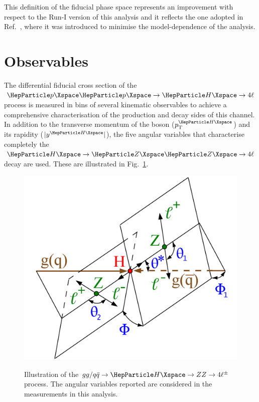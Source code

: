This definition of the fiducial phase space represents an improvement with respect to the Run-I version of this analysis and it reflects the one adopted in Ref.~\cite{CMSHIG19001}, where it was introduced to minimise the model-dependence of the analysis.


\section{Observables}
\label{sec:observables}
The differential fiducial cross section of the $\Pp\Pp\to\Hllll$ process is measured in bins of several kinematic observables to achieve a comprehensive characterisation of the production and decay sides of this channel.
In addition to the transverse momentum of the \PH boson ($\pt^{\PH}$) and
its rapidity ($\abs{y^{\PH}}$), the five angular variables that characterise completely the $\HZZfl$ decay are used.
These are illustrated in Fig.~\ref{fig:decayHZZ4l}. 

\begin{figure}[tbp]
	\centering
	{\includegraphics[width=0.57\columnwidth]{Images/H4L/KinematicObservables/angles-h4l.pdf}}
	\caption{Illustration of the $gg/q\bar{q}\to \PH\to ZZ\to 4\ell^\pm$ process. The angular variables reported are considered in the measurements in this analysis. }
	\label{fig:decayHZZ4l}
\end{figure}

